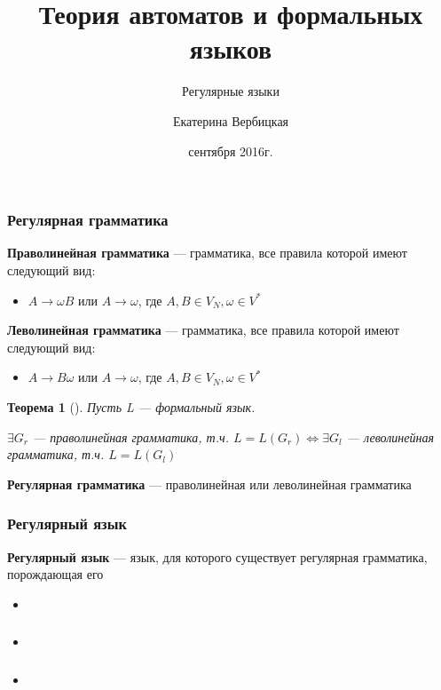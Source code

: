 \documentclass{beamer}
\title[]{Теория автоматов и формальных языков}
\subtitle[]{Регулярные языки}
\institute[]{
Санкт-Петербургский государственный электротехнический университет <<ЛЭТИ>>\\
}
\author[]{Екатерина Вербицкая}
\date{ сентября 2016г.}
\newtheorem{rutheorem}{Теорема}
\begin{document}
{
  \begin{frame}
    \titlepage
  \end{frame}
}

\begin{frame}[fragile]
  \transwipe[direction=90]
  \frametitle{Регулярная грамматика}
  \textbf{Праволинейная грамматика} --- грамматика, все правила которой имеют следующий вид:
  \begin{itemize}
    \item $A \rightarrow \omega B$ или $A \rightarrow \omega$, где $A, B \in V_N, \omega \in V^*$
  \end{itemize}


  \textbf{Леволинейная грамматика} --- грамматика, все правила которой имеют следующий вид:
  \begin{itemize}
    \item $A \rightarrow B \omega$ или $A \rightarrow \omega$, где $A, B \in V_N, \omega \in V^*$
  \end{itemize}

\pause 

  \begin{rutheorem}[]
    Пусть L --- формальный язык. 

    $\exists G_r$ --- праволинейная грамматика, т.ч. $L = L(G_r) \Leftrightarrow \exists G_l$ --- леволинейная грамматика, т.ч. $L = L(G_l) $
  \end{rutheorem}
\pause
  \textbf{Регулярная грамматика} --- праволинейная или леволинейная грамматика
\end{frame}

\begin{frame}[fragile]
  \transwipe[direction=90]
  \frametitle{Регулярный язык}
  \textbf{Регулярный язык} --- язык, для которого существует регулярная грамматика, порождающая его
  \begin{itemize}
    \item 
  \end{itemize}

\end{frame}


\begin{frame}[fragile]
  \transwipe[direction=90]
  \frametitle{}
  \begin{itemize}
    \item 
  \end{itemize}
\end{frame}

\begin{frame}[fragile]
  \transwipe[direction=90]
  \frametitle{}
  \begin{itemize}
    \item 
  \end{itemize}
\end{frame}
\end{document}
